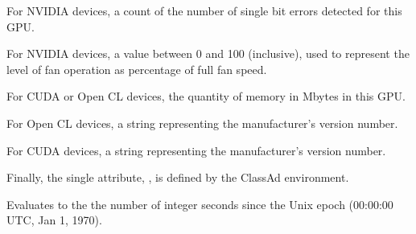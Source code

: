 \begin{description}
\item[\AdAttr{<name>EccErrorsSingleBit}:] For NVIDIA devices,
a count of the number of single bit errors detected for this GPU.

\item[\AdAttr{<name>FanSpeedPct}:] For NVIDIA devices,
a value between 0 and 100 (inclusive), used to represent the level
of fan operation as percentage of full fan speed. 

\item[\AdAttr{<name>GlobalMemoryMb}:] For CUDA or Open CL devices,
the quantity of memory in Mbytes in this GPU.

\item[\AdAttr{<name>OpenCLVersion}:] For Open CL devices,
a string representing the manufacturer's version number.

\item[\AdAttr{<name>RuntimeVersion}:] For CUDA devices,
a string representing the manufacturer's version number.

\end{description}

Finally, the single attribute, 
, is defined by the ClassAd
environment.
\begin{description}
\item[\AdAttr{CurrentTime}:] Evaluates to the 
the number of integer seconds since the Unix epoch (00:00:00 UTC, Jan 1, 1970).
\end{description}
